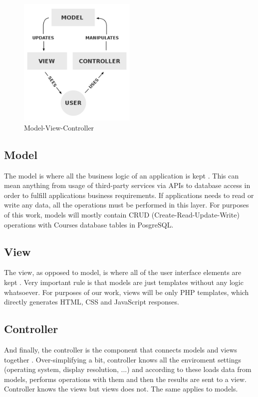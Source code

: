 \begin{figure}[t]
    \centering
    \includegraphics[width=0.5\textwidth]{images/mvc.png}
    \caption{Model-View-Controller}
    \label{fig:mvc}
\end{figure}

\subsection{Model}

The model is where all the business logic of an application is kept \cite{phpmvc}. This can mean anything from usage of third-party services via APIs to database access in order to fulfill applications business requirements. If applications needs to read or write any data, all the operations must be performed in this layer. For purposes of this work, models will mostly contain CRUD (Create-Read-Update-Write) operations with Courses database tables in PosgreSQL.

\subsection{View}

The view, as opposed to model, is where all of the user interface elements are kept \cite{phpmvc}. Very important rule is that models are just templates without any logic whatsoever. For purposes of our work, views will be only PHP templates, which directly generates HTML, CSS and JavaScript responses.

\subsection{Controller}

And finally, the controller is the component that connects models and views together \cite{phpmvc}. Over-simplifying a bit, controller knows all the enviroment settings (operating system, display resolution, ...) and according to these loads data from models, performs operations with them and then the results are sent to a view. Controller knows the views but views does not. The same applies to models.

